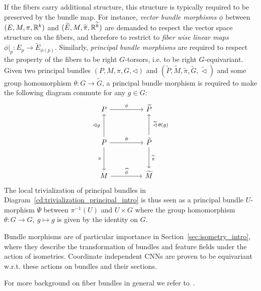If the fibers carry additional structure, this structure is typically required to be preserved by the bundle map.
For instance, \emph{vector bundle morphisms} $\phi$ between $(E,M,\pi,\mathbb{R}^k)$ and $(\widetilde{E},M,\widetilde{\pi},\mathbb{R}^{\widetilde{k}})$ are demanded to respect the vector space structure on the fibers, and therefore to restrict to \emph{fiber wise linear maps $\phi|_p: E_p \to \widetilde{E}_{\phi(p)}$}.
Similarly, \emph{principal bundle morphisms} are required to respect the property of the fibers to be right $G$-torsors, i.e. to be right $G$-equivariant.
Given two principal bundles $(P,M,\pi,G,\lhd)$ and $(\widetilde{P},\widetilde{M},\widetilde{\pi},\widetilde{G},\widetilde{\lhd})$ and some group homomorphism $\theta:G \to \widetilde{G}$, a principal bundle morphism is required to make the following diagram commute for any $g\in G$:
\begin{equation}\label{cd:principal_bundle_morphism}
\begin{tikzcd}[row sep=3.em, column sep=4.5em]
    P
            \arrow[r, "\phi"]
    & \widetilde{P}
    \\
    P
            \arrow[d, "\pi\,"']
            \arrow[r, "\phi"]
            \arrow[u, "\lhd g\ "]
    & \widetilde{P}
            \arrow[d, "\,\widetilde{\pi}"]
            \arrow[u, "\ \widetilde{\lhd}\, \theta(g)"']
    \\
    M
            \arrow[r, "\widehat{\phi}"]
    & \widetilde{M}
\end{tikzcd}
\end{equation}
The local trivialization of principal bundles in Diagram~\eqref{cd:trivialization_principal_intro} is thus seen as a principal bundle $U$-morphism $\Psi$ between $\pi^{-1}(U)$ and $U \times G$ where the group homomorphism $\theta: G\to G,\ g\mapsto g$ is given by the identity on $G$.

Bundle morphisms are of particular importance in Section~\ref{sec:isometry_intro}, where they describe the transformation of bundles and feature fields under the action of isometries.
Coordinate independent CNNs are proven to be equivariant w.r.t. these actions on bundles and their sections.

For more background on fiber bundles in general we refer to~\cite{schullerGeometricalAnatomy2016,nakahara2003geometry,husemollerFibreBundles1994a,steenrodTopologyFibreBundles,shoshichikobayashiFoundationsDifferentialGeometry1963,marshGaugeTheoriesFiber2016,wendlLectureNotesBundles2008}.
